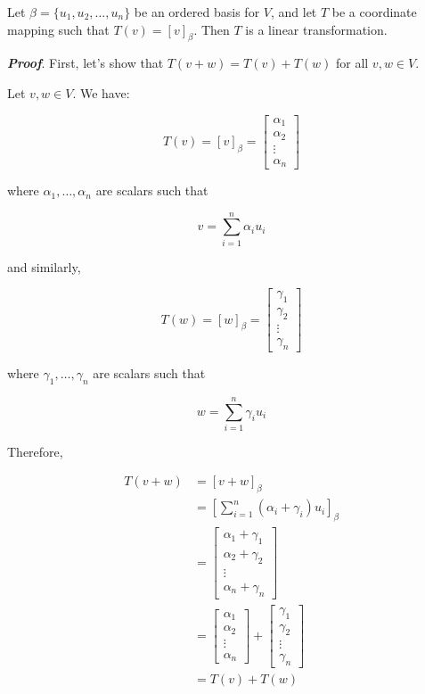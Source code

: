 \documentclass{report}
\begin{document}
    \begin{Example}
        Let $\beta = \{u_1, u_2, \dots , u_n\}$ be an ordered basis for $V$, and let $T$ be a coordinate mapping such that $T(v) = [v]_\beta$. Then $T$ is a linear transformation.

        \textit{\textbf{Proof}}. First, let's show that $T(v + w) = T(v) + T(w)$ for all $v, w \in V$.

        Let $v, w \in V$. We have:

        $$T(v) = [v]_\beta = \begin{bmatrix}
            \alpha_1\\ \alpha_2\\ \vdots \\ \alpha_n
        \end{bmatrix}$$

        where $\alpha_1,\dots, \alpha_n$ are scalars such that

        $$v = \sum_{i=1}^{n} \alpha_i u_i$$

        and similarly,

        $$T(w) = [w]_\beta = \begin{bmatrix}
            \gamma_1\\ \gamma_2\\ \vdots \\ \gamma_n
        \end{bmatrix}$$

        where $\gamma_1,\dots, \gamma_n$ are scalars such that

        $$w = \sum_{i=1}^{n} \gamma_i u_i$$

        Therefore,

        \begin{align*}
        T(v + w) &= [v + w]_\beta \\
        &= \left[\sum_{i=1}^{n} (\alpha_i + \gamma_i) u_i\right]_\beta \\
        &= \begin{bmatrix}
            \alpha_1 + \gamma_1\\ \alpha_2 + \gamma_2\\ \vdots \\ \alpha_n + \gamma_n
        \end{bmatrix} \\
        &= \begin{bmatrix}
            \alpha_1\\ \alpha_2\\ \vdots \\ \alpha_n
        \end{bmatrix} + \begin{bmatrix}
            \gamma_1\\ \gamma_2\\ \vdots \\ \gamma_n
        \end{bmatrix} \\
        &= T(v) + T(w)
        \end{align*}


\end{Example}
\end{document}
